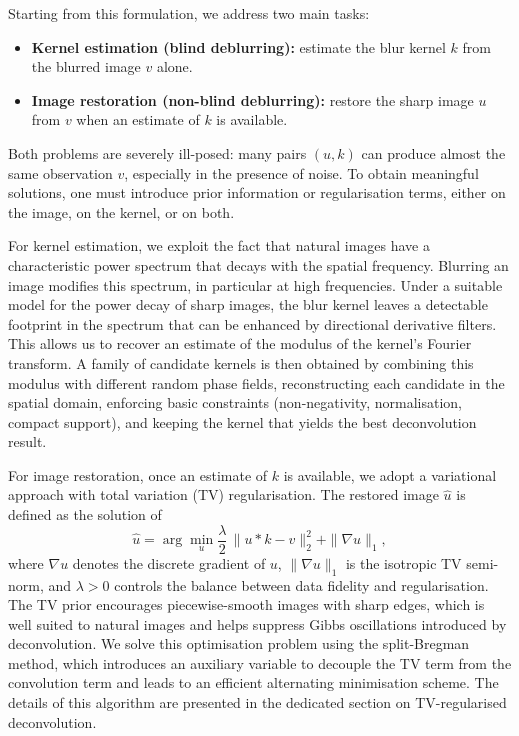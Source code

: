 \documentclass[a4paper,11pt]{article}
\begin{document}
Starting from this formulation, we address two main tasks:
\begin{itemize}
    \item \textbf{Kernel estimation (blind deblurring):} estimate the blur kernel $k$ from the blurred image $v$ alone.
    \item \textbf{Image restoration (non-blind deblurring):} restore the sharp image $u$ from $v$ when an estimate of $k$ is available.
\end{itemize}
Both problems are severely ill-posed: many pairs $(u,k)$ can produce almost the same observation $v$, especially in the presence of noise. To obtain meaningful solutions, one must introduce prior information or regularisation terms, either on the image, on the kernel, or on both.

For kernel estimation, we exploit the fact that natural images have a characteristic power spectrum that decays with the spatial frequency. Blurring an image modifies this spectrum, in particular at high frequencies. Under a suitable model for the power decay of sharp images, the blur kernel leaves a detectable footprint in the spectrum that can be enhanced by directional derivative filters. This allows us to recover an estimate of the modulus of the kernel’s Fourier transform. A family of candidate kernels is then obtained by combining this modulus with different random phase fields, reconstructing each candidate in the spatial domain, enforcing basic constraints (non-negativity, normalisation, compact support), and keeping the kernel that yields the best deconvolution result.

For image restoration, once an estimate of $k$ is available, we adopt a variational approach with total variation (TV) regularisation. The restored image $\hat{u}$ is defined as the solution of
\[
\hat{u} = \arg\min_u \frac{\lambda}{2}\,\|u * k - v\|_2^2 + \|\nabla u\|_1,
\]
where $\nabla u$ denotes the discrete gradient of $u$, $\|\nabla u\|_1$ is the isotropic TV semi-norm, and $\lambda > 0$ controls the balance between data fidelity and regularisation. The TV prior encourages piecewise-smooth images with sharp edges, which is well suited to natural images and helps suppress Gibbs oscillations introduced by deconvolution. We solve this optimisation problem using the split-Bregman method, which introduces an auxiliary variable to decouple the TV term from the convolution term and leads to an efficient alternating minimisation scheme. The details of this algorithm are presented in the dedicated section on TV-regularised deconvolution.
\end{document}
